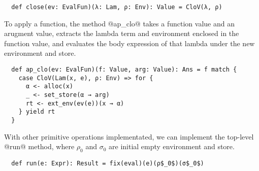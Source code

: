 \begin{lstlisting}
  def close(ev: EvalFun)(λ: Lam, ρ: Env): Value = CloV(λ, ρ)
\end{lstlisting}

To apply a function, the method @ap_clo@ takes a function value and an arugment
value, extracts the lambda term and environment enclosed in the function value,
and evaluates the body expression of that lambda under the new environment and store.

\begin{lstlisting}
  def ap_clo(ev: EvalFun)(f: Value, arg: Value): Ans = f match {
    case CloV(Lam(x, e), ρ: Env) => for {
      α <- alloc(x)
      _ <- set_store(α → arg)
      rt <- ext_env(ev(e))(x → α)
    } yield rt
  }
\end{lstlisting}

With other primitive operations implementated, we can implement the top-level
@run@ method, where $\rho_0$ and $\sigma_0$ are initial empty environment and
store.

\begin{lstlisting}
  def run(e: Expr): Result = fix(eval)(e)(ρ$_0$)(σ$_0$)
\end{lstlisting}

